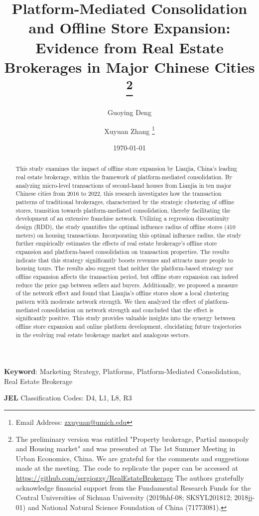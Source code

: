\documentclass[11pt]{article}
\title{ \vspace*{-2.5cm} \hspace*{-0.5cm}Platform-Mediated Consolidation and Offline Store Expansion: Evidence from Real Estate Brokerages in Major Chinese Cities \footnote{
The preliminary version was entitled "Property brokerage, Partial monopoly and Housing market" and was presented at The 1st Summer Meeting in Urban Economics, China. We are grateful for the comments and suggestions made at the meeting. The code to replicate the paper can be accessed at \href{https://github.com/sergiozxy/RealEstateBrokerage}{https://github.com/sergiozxy/RealEstateBrokerage} The authors gratefully acknowledge financial support from the Fundamental Research Funds for the Central Universities of Sichuan University (2019hhf-08; SKSYL201812; 2018jj-01) and National Natural Science Foundation of China (71773081). %
}}
\date{ \vspace*{0.5cm} \today}
\begin{document}
\author[1]{Guoying Deng}
\author[2]{Xuyuan Zhang \thanks{Email Address: \href{mailto:zxuyuan@umich.edu}{zxuyuan@umich.edu}}}

\bgroup
\let\footnoterule\relax

\begin{singlespace}
\maketitle

\begin{abstract}
    \noindent This study examines the impact of offline store expansion by Lianjia, China's leading real estate brokerage, within the framework of platform-mediated consolidation. By analyzing micro-level transactions of second-hand houses from Lianjia in ten major Chinese cities from 2016 to 2022, this research investigates how the transaction patterns of traditional brokerages, characterized by the strategic clustering of offline stores, transition towards platform-mediated consolidation, thereby facilitating the development of an extensive franchise network. Utilizing a regression discontinuity design (RDD), the study quantifies the optimal influence radius of offline stores (410 meters) on housing transactions. Incorporating this optimal influence radius, the study further empirically estimates the effects of real estate brokerage's offline store expansion and platform-based consolidation on transaction properties. The results indicate that this strategy significantly boosts revenues and attracts more people to housing tours. The results also suggest that neither the platform-based strategy nor offline expansion affects the transaction period, but offline store expansion can indeed reduce the price gap between sellers and buyers. Additionally, we proposed a measure of the network effect and found that Lianjia's offline stores show a local clustering pattern with moderate network strength. We then analyzed the effect of platform-mediated consolidation on network strength and concluded that the effect is significantly positive. This study provides valuable insights into the synergy between offline store expansion and online platform development, elucidating future trajectories in the evolving real estate brokerage market and analogous sectors.
  \end{abstract}
  
  \textbf{Keyword}: Marketing Strategy, Platforms, Platform-Mediated Consolidation, Real Estate Brokerage
  
  \textbf{JEL} Classification Codes: D4, L1, L8, R3
\end{singlespace}
\thispagestyle{empty}
\end{document}
